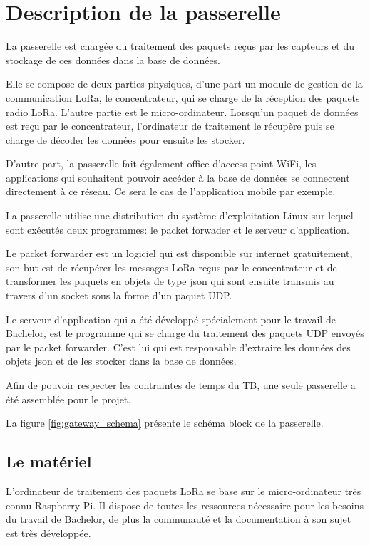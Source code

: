 
\chapter{Description de la passerelle}\label{ch:passerelle}

La passerelle est chargée du traitement des paquets reçus par les capteurs et du stockage de ces données dans la base de données. 

Elle se compose de deux parties physiques, d'une part un module de gestion de la communication LoRa, le concentrateur, qui se charge de la réception des paquets radio LoRa. L'autre partie est le micro-ordinateur. Lorsqu'un paquet de données est reçu par le concentrateur, l'ordinateur de traitement le récupère puis se charge de décoder les données pour ensuite les stocker.

D'autre part, la passerelle fait également office d'access point WiFi, les applications qui souhaitent pouvoir accéder à la base de données se connectent directement à ce réseau. Ce sera le cas de l'application mobile par exemple.

La passerelle utilise une distribution du système d'exploitation Linux sur lequel sont exécutés deux programmes: le packet forwader et le serveur d'application.

Le packet forwarder est un logiciel qui est disponible sur internet gratuitement, son but est de récupérer les messages LoRa reçus par le concentrateur et de transformer les paquets en objets de type json qui sont ensuite transmis au travers d'un socket sous la forme d'un paquet UDP.

Le serveur d'application qui a été développé spécialement pour le travail de Bachelor, est le programme qui se charge du traitement des paquets UDP envoyés par le packet forwarder. C'est lui qui est responsable d'extraire les données des objets json et de les stocker dans la base de données.

Afin de pouvoir respecter les contraintes de temps du TB, une seule passerelle a été assemblée pour le projet.

La figure \ref{fig:gateway_schema} présente le schéma block de la passerelle.

\section{Le matériel}

L'ordinateur de traitement des paquets LoRa se base sur le micro-ordinateur très connu Raspberry Pi. Il dispose de toutes les ressources nécessaire pour les besoins du travail de Bachelor, de plus la communauté et la documentation à son sujet est très développée.


